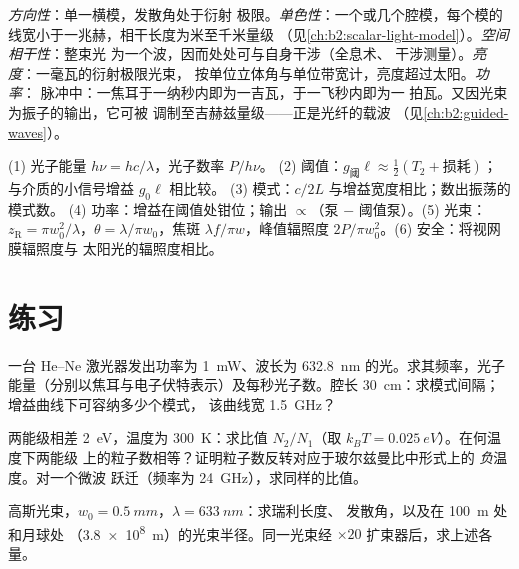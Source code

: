 \begin{remark}[激光的特殊之处]\label{rem:b2:laser:special}
\emph{方向性}：单一横模，发散角处于衍射
极限。\emph{单色性}：一个或几个腔模，每个模的
线宽小于一兆赫，相干长度为米至千米量级
（见\cref{ch:b2:scalar-light-model}）。\emph{空间相干性}：整束光
为一个波，因而处处可与自身干涉（全息术、
干涉测量）。\emph{亮度}：一毫瓦的衍射极限光束，
按单位立体角与单位带宽计，亮度超过太阳。\emph{功率}：
脉冲中：一焦耳于一纳秒内即为一吉瓦，于一飞秒内即为一
拍瓦。又因光束为振子的输出，它可被
调制至吉赫兹量级——正是光纤的载波
（见\cref{ch:b2:guided-waves}）。
\end{remark}

\begin{method}[激光估算]\label{meth:b2:laser:method}
(1) 光子能量 $h\nu = hc/\lambda$，光子数率 $P/h\nu$。
(2) 阈值：$g_{\text{阈}}\ell \approx \tfrac12(T_2 + \text{损耗})$；
与介质的小信号增益 $g_0\ell$ 相比较。
(3) 模式：$c/2L$ 与增益宽度相比；数出振荡的模式数。
(4) 功率：增益在阈值处钳位；输出 $\propto$（泵 $-$
阈值泵）。(5) 光束：$z_{\text{R}} = \pi w_0^2/\lambda$，$\theta =
\lambda/\pi w_0$，焦斑 $\lambda f/\pi w$，峰值辐照度
$2P/\pi w_0^2$。(6) 安全：将视网膜辐照度与
太阳光的辐照度相比。
\end{method}

\section{练习}

\begin{exercise}[$\star$]\label{exo:b2:laser:1}
一台 He--Ne 激光器发出功率为 \qty{1}{mW}、波长为 \qty{632.8}{nm} 的光。求其频率，光子
能量（分别以焦耳与电子伏特表示）及每秒光子数。腔长
\qty{30}{cm}：求模式间隔；增益曲线下可容纳多少个模式，
该曲线宽 \qty{1.5}{GHz}？
\end{exercise}

\begin{exercise}[$\star$]\label{exo:b2:laser:2}
两能级相差 \qty{2}{eV}，温度为 \qty{300}{K}：求比值 $N_2/N_1$（取
$k_BT = \qty{0.025}{eV}$）。在何温度下两能级
上的粒子数相等？证明粒子数反转对应于玻尔兹曼比中形式上的
\emph{负}温度。对一个微波
跃迁（频率为 \qty{24}{GHz}），求同样的比值。
\end{exercise}

\begin{exercise}[$\star$]\label{exo:b2:laser:3}
高斯光束，$w_0 = \qty{0.5}{mm}$，$\lambda = \qty{633}{nm}$：求瑞利长度、
发散角，以及在 \qty{100}{m} 处和月球处
（\qty{3.8e8}{m}）的光束半径。同一光束经 $\times 20$ 扩束器后，求上述各量。
\end{exercise}

